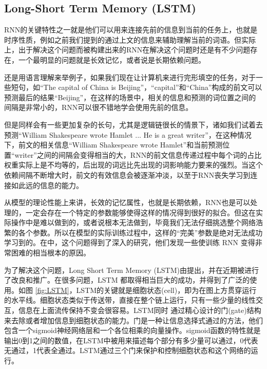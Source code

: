 \documentclass[10pt, titlepage]{article}
\begin{document}
\subsection{Long-Short Term Memory (LSTM)}

RNN的关键特性之一就是他们可以用来连接先前的信息到当前的任务上，也就是时序性质，例如之前我们提到的通过上文的信息来辅助理解当前的词语。但实际上，出于解决这个问题而被构建出来的RNN在解决这个问题时还是有不少问题存在，一个最明显的问题就是长效记忆，或者说是长期依赖问题。

还是用语言理解来举例子，如果我们现在让计算机来进行完形填空的任务，对于一些短句，如“The capital of China is Beijing”，“capital”和“China”构成的前文可以预测最后的结果“Beijing”，在这样的场景中，相关的信息和预测的词位置之间的间隔是非常小的，RNN可以很不错地学会使用先前的信息。

但是同样会有一些更加复杂的长句，尤其是逻辑链很长的情景下，诸如我们试着去预测“William Shakespeare wrote Hamlet ... He is a great writer”，在这种情况下，前文的相关信息“William Shakespeare wrote Hamlet”和当前预测位置“writer”之间的间隔会变得相当的大，RNN的前文信息传递过程中每个词的占比权重实际上是不均等的，后出现的词远比先出现的词影响能力要来的强烈。当这个依赖间隔不断增大时，前文的有效信息会被逐渐冲淡，以至于RNN丧失学习到连接如此远的信息的能力。

从模型的理论性能上来讲，长效的记忆属性，也就是长期依赖，RNN也是可以处理的，一定会存在一个特定的参数能够使得这样的情况得到很好的拟合。但这在实际操作中是难以做到的，或者说根本无法做到，毕竟我们无法仔细挑选整个网络浩繁的各个参数。所以在模型的实际训练过程中，这样的“完美”参数是绝对无法成功学习到的。在\cite{Bengio1994Learning}中，这个问题得到了深入的研究，他们发现一些使训练 RNN 变得非常困难的相当根本的原因。


为了解决这个问题，Long Short Term Memory (LSTM)由\cite{Hochreiter1997Long}提出，并在近期被进行了改良和推广。在很多问题，LSTM 都取得相当巨大的成功，并得到了广泛的使用。如图 \ref{fig:LSTM}，LSTM的关键就是细胞状态(cell)，即为在图上方贯穿运行的水平线。细胞状态类似于传送带，直接在整个链上运行，只有一些少量的线性交互，信息在上面流传保持不变会很容易。LSTM同时 通过精心设计的门(gate)结构来去除或者增加信息到细胞状态的能力。门是一种让信息选择式通过的方法，他们包含一个sigmoid神经网络层和一个各位相乘的向量操作。sigmoid函数的特性就是输出0到1之间的数值，在LSTM中被用来描述每个部分有多少量可以通过，0代表无通过，1代表全通过。LSTM通过三个门来保护和控制细胞状态和这个网络的运行。
\end{document}
